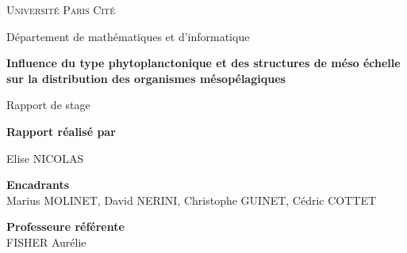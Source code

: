 \documentclass{article}
\begin{document}
	
	\begin{titlepage}
		\centering
		\vspace{0.5em}
		
		{\scshape\LARGE Université Paris Cité \par}
		\vspace{0.4cm}
		{\large Département de mathématiques et d'informatique}
		
		\vspace{1cm}  
		
		{\Large \bfseries Influence du type phytoplanctonique et des structures de méso échelle sur la distribution des organismes mésopélagiques\par}
		\vspace{0.2cm}
		{\Large  Rapport de stage\par}
		
		\vspace{1cm}
		
		\begin{abstract}
			
		\end{abstract}
		
		\vspace{1cm}
		
		{\large \textbf{Rapport réalisé par}}\\[0.2cm]
		{\large Elise NICOLAS\par}
		
		\vspace{0.6cm}
		
		{\large \textbf{Encadrants}}\\[0.2cm]
		{\large Marius MOLINET, David NERINI, Christophe GUINET, Cédric COTTET}
		
		\vspace{0.6cm}
		
		{\large \textbf{Professeure référente}}\\[0.2cm]
		{\large FISHER Aurélie}
		
		
		
		\vspace{0.8cm} 
		
		{\large \date{} \par}
	\end{titlepage}
	
	\clearpage
	\tableofcontents
	
	\clearpage
\end{document}
